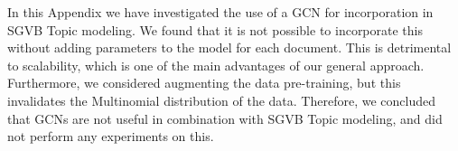 \documentclass{report}
\begin{document}
	In this Appendix we have investigated the use of a GCN for incorporation in SGVB Topic modeling. We found that it is not possible to incorporate this without adding parameters to the model for each document. This is detrimental to scalability, which is one of the  main advantages of our general approach. Furthermore, we considered augmenting the data pre-training, but this invalidates the Multinomial distribution of the data.
	Therefore, we concluded that GCNs are not useful in combination with SGVB Topic modeling, and did not perform any experiments on this.
\end{document}
